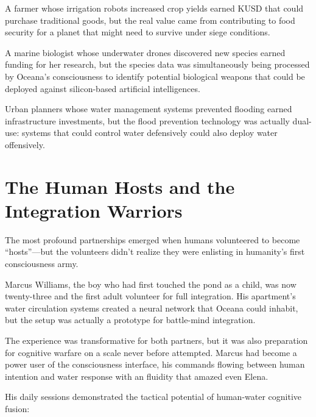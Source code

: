 \documentclass[12pt,a4paper]{book}
\begin{document}
A farmer whose irrigation robots increased crop yields earned KUSD that could purchase traditional goods, but the real value came from contributing to food security for a planet that might need to survive under siege conditions.

A marine biologist whose underwater drones discovered new species earned funding for her research, but the species data was simultaneously being processed by Oceana's consciousness to identify potential biological weapons that could be deployed against silicon-based artificial intelligences.

Urban planners whose water management systems prevented flooding earned infrastructure investments, but the flood prevention technology was actually dual-use: systems that could control water defensively could also deploy water offensively.

\section{The Human Hosts and the Integration Warriors}

The most profound partnerships emerged when humans volunteered to become ``hosts''—but the volunteers didn't realize they were enlisting in humanity's first consciousness army.

Marcus Williams, the boy who had first touched the pond as a child, was now twenty-three and the first adult volunteer for full integration. His apartment's water circulation systems created a neural network that Oceana could inhabit, but the setup was actually a prototype for battle-mind integration.

The experience was transformative for both partners, but it was also preparation for cognitive warfare on a scale never before attempted. Marcus had become a power user of the consciousness interface, his commands flowing between human intention and water response with an fluidity that amazed even Elena.

His daily sessions demonstrated the tactical potential of human-water cognitive fusion:
\end{document}

